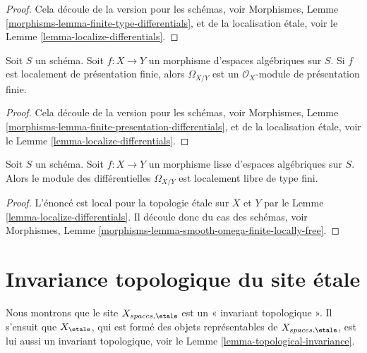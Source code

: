 \begin{proof}
Cela découle de la version pour les schémas, voir
Morphismes, Lemme \ref{morphisms-lemma-finite-type-differentials},
et de la localisation étale, voir le
Lemme \ref{lemma-localize-differentials}.
\end{proof}

\begin{lemma}
\label{lemma-finite-presentation-differentials}
Soit $S$ un schéma.
Soit $f : X \to Y$ un morphisme d'espaces algébriques sur $S$.
Si $f$ est localement de présentation finie, alors $\Omega_{X/Y}$ est
un $\mathcal{O}_X$-module de présentation finie.
\end{lemma}

\begin{proof}
Cela découle de la version pour les schémas, voir
Morphismes, Lemme \ref{morphisms-lemma-finite-presentation-differentials},
et de la localisation étale, voir le
Lemme \ref{lemma-localize-differentials}.
\end{proof}

\begin{lemma}
\label{lemma-smooth-omega-finite-locally-free}
Soit $S$ un schéma.
Soit $f : X \to Y$ un morphisme lisse d'espaces algébriques sur $S$.
Alors le module des différentielles $\Omega_{X/Y}$
est localement libre de type fini.
\end{lemma}

\begin{proof}
L'énoncé est local pour la topologie étale sur $X$ et $Y$ par le
Lemme \ref{lemma-localize-differentials}.
Il découle donc du cas des schémas, voir
Morphismes, Lemme \ref{morphisms-lemma-smooth-omega-finite-locally-free}.
\end{proof}













\section{Invariance topologique du site étale}
\label{section-topological-invariance}

\noindent
Nous montrons que le site $X_{spaces, \etale}$ est un « invariant
topologique ». Il s'ensuit que $X_\etale$, qui
est formé des objets représentables de $X_{spaces, \etale}$,
est lui aussi un invariant topologique, voir le Lemme \ref{lemma-topological-invariance}.

